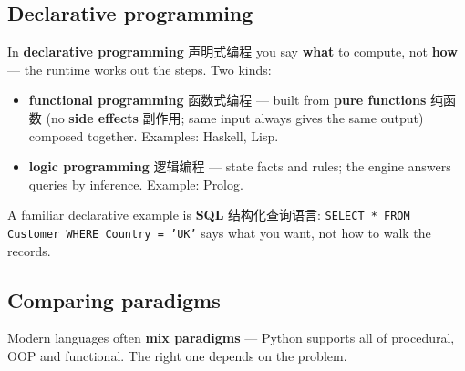 \documentclass[11pt]{article}
\begin{document}
\subsection*{Declarative programming}

In \textbf{declarative programming} 声明式编程 you say \textbf{what} to compute, not \textbf{how} — the runtime works out the steps. Two kinds:

\begin{itemize}
\item \textbf{functional programming} 函数式编程 — built from \textbf{pure functions} 纯函数 (no \textbf{side effects} 副作用; same input always gives the same output) composed together. Examples: Haskell, Lisp.

\item \textbf{logic programming} 逻辑编程 — state facts and rules; the engine answers queries by inference. Example: Prolog.

\end{itemize}

A familiar declarative example is \textbf{SQL} 结构化查询语言: \texttt{SELECT * FROM Customer WHERE Country = 'UK'} says what you want, not how to walk the records.

\subsection*{Comparing paradigms}

\begin{center}
\end{center}

Modern languages often \textbf{mix paradigms} — Python supports all of procedural, OOP and functional. The right one depends on the problem.
\end{document}
